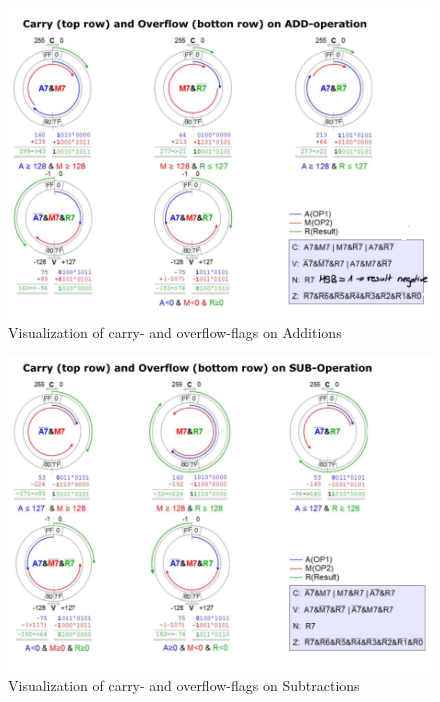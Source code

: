 \documentclass[a4paper, 11pt, nofootinbib]{book}
\begin{document}
\begin{figure}[htb]
	\centering
	\includegraphics[keepaspectratio=true,height=19\baselineskip]{flags_add.PNG}
	\caption{Visualization of carry- and overflow-flags on Additions}
	\label{fig:flags_add}
\end{figure}

\restoregeometry
\newpage

\begin{figure}[htb]
	\centering
	\includegraphics[keepaspectratio=true,height=20\baselineskip]{flags_sub.PNG}
	\caption{Visualization of carry- and overflow-flags on Subtractions}
	\label{fig:flags_sub}
\end{figure}
\end{document}
